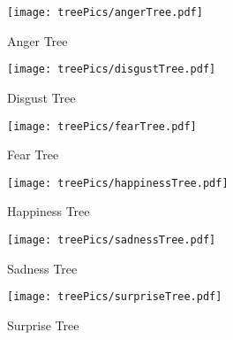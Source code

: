 \documentclass[12pt, a4paper]{article}
\begin{document}
\begin{figure}[h!]
\centering
\texttt{[image: treePics/angerTree.pdf]}
\caption{Anger Tree}
\label{firstTree}
\end{figure}
\begin{figure}[h!]
\centering
\texttt{[image: treePics/disgustTree.pdf]}
\caption{Disgust Tree}
\end{figure}
\begin{figure}[h!]
\centering
\texttt{[image: treePics/fearTree.pdf]}
\caption{Fear Tree}
\end{figure}
\begin{figure}[!hb]
\centering
\texttt{[image: treePics/happinessTree.pdf]}
\caption{Happiness Tree}
\end{figure}
\begin{figure}[!hb]
\centering
\texttt{[image: treePics/sadnessTree.pdf]}
\caption{Sadness Tree}
\end{figure}
\begin{figure}[!hb]
\centering
\texttt{[image: treePics/surpriseTree.pdf]}
\caption{Surprise Tree}
\label{lastTree}
\end{figure}
\end{document}
